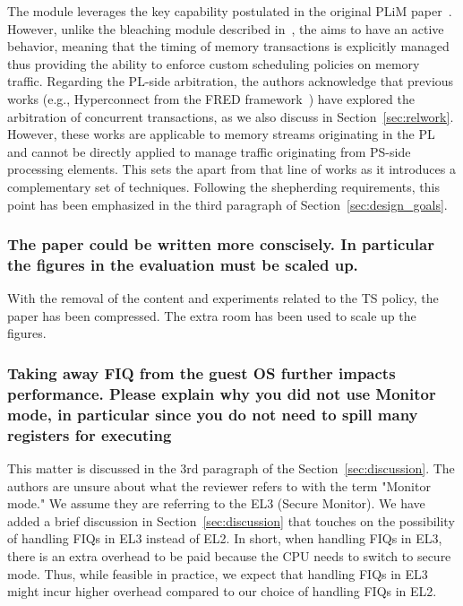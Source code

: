        The \schim module leverages the key capability postulated in
        the original PLiM paper~\cite{PLIM20}. However, unlike the
        bleaching module described in~\cite{PLIM20}, the \schim aims
        to have an active behavior, meaning that the timing of memory
        transactions is explicitly managed thus providing the ability
        to enforce custom scheduling policies on memory traffic.
        Regarding the PL-side arbitration, the authors acknowledge
        that previous works (e.g., Hyperconnect from the FRED
        framework~\cite{fred_hyperconnect}) have explored the arbitration of concurrent
        transactions, as we also discuss in
        Section~\ref{sec:relwork}. However, these works are applicable
        to memory streams originating in the PL and cannot be directly
        applied to manage traffic originating from PS-side processing
        elements. This sets the \schim apart from that line of works
        as it introduces a complementary set of techniques. Following
        the shepherding requirements, this point has been emphasized
        in the third paragraph of Section~\ref{sec:design_goals}.



        \subsubsection{The paper could be written more conscisely. In
        particular the figures in the evaluation must be scaled up.}

        With the removal of the content and experiments related to the
        TS policy, the paper has been compressed. The extra room has
        been used to scale up the figures.

        \subsubsection{Taking away FIQ from the guest OS further
        impacts performance. Please explain why you did not use
        Monitor mode, in particular since you do not need to spill
        many registers for executing}

        This matter is discussed in the 3rd paragraph of the
        Section~\ref{sec:discussion}. The authors are unsure about
        what the reviewer refers to with the term "Monitor mode." We
        assume they are referring to the EL3 (Secure Monitor). We have
        added a brief discussion in Section~\ref{sec:discussion} that
        touches on the possibility of handling FIQs in EL3 instead of
        EL2. In short, when handling FIQs in EL3, there is an extra
        overhead to be paid because the CPU needs to switch to secure
        mode. Thus, while feasible in practice, we expect that
        handling FIQs in EL3 might incur higher overhead compared to
        our choice of handling FIQs in EL2.

